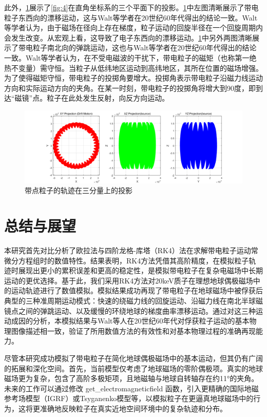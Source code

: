 \documentclass[11pt]{article}
\begin{document}
此外，\cref{fig:6}展示了\cref{fig:4}在直角坐标系的三个平面下的投影。\cref{fig:6}中左图清晰展示了带电粒子东西向的漂移运动，这与Walt等学者在20世纪60年代得出的结论一致。Walt等学者认为，由于磁场在径向上存在梯度，粒子运动的回旋半径在一个回旋周期内会发生改变。从宏观上看，这导致了电子东西向的漂移运动。\cref{fig:6}中另外两图清晰展示了带电粒子南北向的弹跳运动，这也与Walt等学者在20世纪60年代得出的结论一致。Walt等学者认为，在不受电磁波的干扰下，带电粒子的磁矩（也称第一绝热不变量）需守恒。当粒子从低纬地区运动到高纬地区，其所在位置的磁场增强。为了使得磁矩守恒，带电粒子的投掷角要增大。投掷角表示带电粒子沿磁力线运动方向和实际运动方向的夹角。在某一时刻，带电粒子的投掷角将增大到90度，即到达“磁镜”点。粒子在此处发生反射，向反方向运动。

\begin{figure}[h]
    \centering
    \includegraphics[width=0.75\linewidth]{Fig/projection_2.png}
    \caption{带点粒子的轨迹在三分量上的投影}
    \label{fig:6}
\end{figure}

\section{总结与展望}
本研究首先对比分析了欧拉法与四阶龙格-库塔（RK4）法在求解带电粒子运动常微分方程组时的数值特性。结果表明，RK4方法凭借其高阶精度，在模拟粒子轨迹时展现出更小的累积误差和更高的稳定性，是模拟带电粒子在复杂电磁场中长期运动的更优选择。基于此，我们采用RK4方法对20keV质子在理想地球偶极磁场中的运动轨迹进行了数值模拟。模拟结果成功再现了带电粒子在地球磁场中被俘获后典型的三种准周期运动模式：快速的绕磁力线的回旋运动、沿磁力线在南北半球磁镜点之间的弹跳运动、以及缓慢的环绕地球的梯度曲率漂移运动。通过对这三种运动成因的分析，本模拟结果与Walt等人在20世纪60年代对俘获粒子运动的基本物理图像描述相一致，验证了所用数值方法的有效性和对基本物理过程的准确再现能力。


尽管本研究成功模拟了带电粒子在简化地球偶极磁场中的基本运动，但其仍有广阔的拓展和深化空间。首先，当前模型仅考虑了地球磁场的零阶偶极项。真实的地球磁场更为复杂，包含了高阶多极矩项，且地磁轴与地球自转轴存在约11°的夹角。 未来的工作可以通过修改 get\_electromagneticfield 函数，引入更精确的国际地磁参考场模型（IGRF）或Tsyganenko模型等，以模拟粒子在更逼真地球磁场中的行为，这将更准确地反映粒子在真实近地空间环境中的复杂轨迹和分布。
\end{document}
